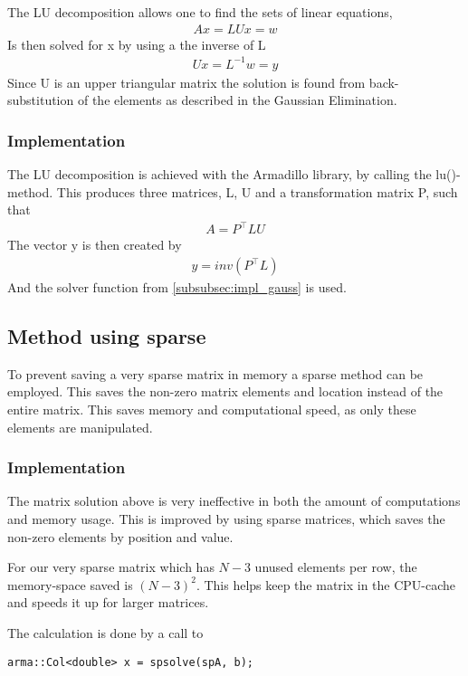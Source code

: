 \documentclass[11pt,a4paper,english,final]{article}
\numberwithin{equation}{section}
\newcommand{\trans}[1]{#1^\top}
\begin{document}
The LU decomposition allows one to find the sets of linear equations,
\begin{gather}
Ax = LUx = w
\end{gather}
Is then solved for x by using a the inverse of L
\begin{gather}
Ux = L^{-1}w = y
\end{gather}
Since U is an upper triangular matrix the solution is found from back-substitution
of the elements as described in the Gaussian Elimination.

\subsubsection{Implementation}

The LU decomposition is achieved with the Armadillo library, by calling
the lu()-method. This produces three matrices, L, U and a transformation
matrix P, such that
\begin{gather}
A = \trans{P}LU
\end{gather}
The vector y is then created by
\begin{gather}
y = inv\left(\trans{P}L  \right)
\end{gather}
And the solver function from \ref{subsubsec:impl_gauss} is used.

\subsection{Method using sparse}

To prevent saving a very sparse matrix in memory a sparse method can be employed.
This saves the non-zero matrix elements and location instead of the 
entire matrix. This saves memory and computational speed, as only these
elements are manipulated.

\subsubsection{Implementation}

The matrix solution above is very ineffective in both the amount
of computations and memory usage. This is improved by using sparse 
matrices, which saves the non-zero elements by position and value.

For our very sparse matrix which has $N-3$ unused elements per row, the
memory-space saved is $(N-3)^2$. This helps keep the matrix in the 
CPU-cache and speeds it up for larger matrices.

The calculation is done by a call to
\begin{lstlisting}
arma::Col<double> x = spsolve(spA, b);
\end{lstlisting}
\end{document}

